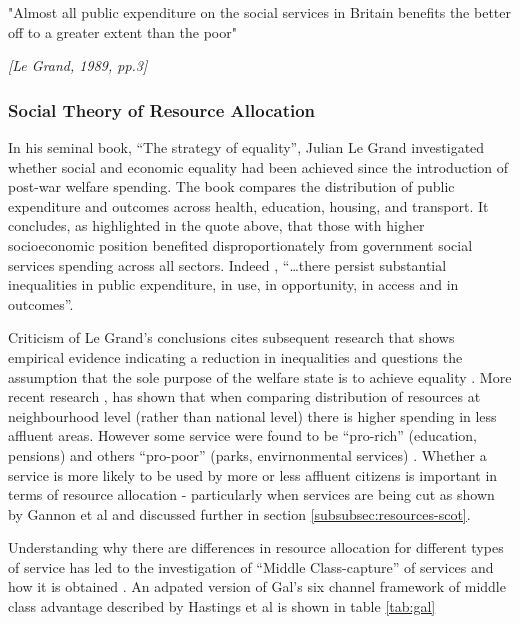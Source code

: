\documentclass[12pt,]{report}
\begin{document}
\epigraph{"Almost all public expenditure on the social services in Britain benefits the better off to a greater extent than the poor"}{\textit{[Le Grand, 1989, pp.3]}}

\subsubsection{Social Theory of Resource Allocation}\label{subsubsec:theory-resources}

In his seminal book, ``The strategy of equality'', Julian Le Grand
\citeyearpar{RN175} investigated whether social and economic equality
had been achieved since the introduction of post-war welfare spending.
The book compares the distribution of public expenditure and outcomes
across health, education, housing, and transport. It concludes, as
highlighted in the quote above, that those with higher socioeconomic
position benefited disproportionately from government social services
spending across all sectors. Indeed , ``\ldots{}there persist
substantial inequalities in public expenditure, in use, in opportunity,
in access and in outcomes''\citep[pp.4]{RN175}.

Criticism of Le Grand's conclusions cites subsequent research that shows
empirical evidence indicating a reduction in inequalities and questions
the assumption that the sole purpose of the welfare state is to achieve
equality \citep{RN113}. More recent research \citetext{\citealp[ cited
in]{RN440}; \citealp{RN116}},\citep{RN441, RN115} has shown that when
comparing distribution of resources at neighbourhood level (rather than
national level) there is higher spending in less affluent areas. However
some service were found to be ``pro-rich'' (education, pensions) and
others ``pro-poor'' (parks, envirnonmental services) \citetext{\citealp[
cited in]{RN440}; \citealp{RN116}}. Whether a service is more likely to
be used by more or less affluent citizens is important in terms of
resource allocation - particularly when services are being cut as shown
by Gannon et al \citeyearpar{RN235} and discussed further in section
\ref{subsubsec:resources-scot}.

Understanding why there are differences in resource allocation for
different types of service has led to the investigation of ``Middle
Class-capture'' of services and how it is obtained
\citep{RN442, RN118, RN116}. An adpated version of Gal's
\citeyearpar{RN442} six channel framework of middle class advantage
described by Hastings et al \citeyearpar{RN116} is shown in table
\ref{tab:gal}
\end{document}
